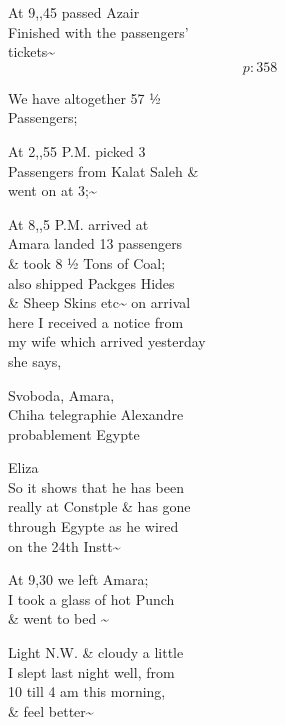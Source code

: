 \documentclass{report}
\begin{document}
	\par{
 	At 9,,45 passed Azair\ \\Finished with the passengers’\ \\tickets\~{}\ \\
  \[p: 358 \]

	}

	\par{
 	We have altogether 57 ½\ \\Passengers;\ \\
	}

	\par{
 	At 2,,55 P.M. picked 3\ \\Passengers from Kalat Saleh \&\ \\went on at 3;\~{}\ \\
	}

	\par{
 	At 8,,5 P.M. arrived at\ \\Amara landed 13 passengers\ \\\& took 8 ½ Tons of Coal;\ \\also shipped Packges Hides\ \\\& Sheep Skins etc\~{} on arrival\ \\here I received a notice from\ \\my wife which arrived yesterday\ \\she says,\ \\
	}

	\par{
 	Svoboda, Amara,\ \\Chiha telegraphie Alexandre\ \\probablement Egypte\ \\
	}

	\par{
 	Eliza\ \\So it shows that he has been\ \\really at Constple \& has gone\ \\through Egypte as he wired\ \\on the 24th Instt\~{}\ \\
	}

	\par{
 	At 9,30 we left Amara;\ \\I took a glass of hot Punch\ \\\& went to bed \~{}\ \\
	}

	\par{
 	Light N.W. \& cloudy a little\ \\I slept last night well, from\ \\10 till 4 am this morning,\ \\\& feel better\~{}\ \\
	}
\end{document}
